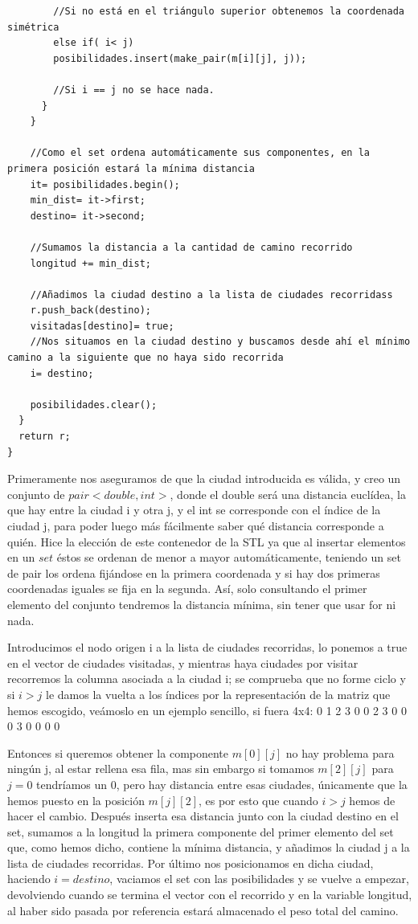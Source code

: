 \documentclass[12pt]{article}
\begin{document}
\begin{itemize}
\begin{lstlisting}
        //Si no está en el triángulo superior obtenemos la coordenada simétrica
        else if( i< j)
        posibilidades.insert(make_pair(m[i][j], j));

        //Si i == j no se hace nada.
      }
    }

    //Como el set ordena automáticamente sus componentes, en la primera posición estará la mínima distancia
    it= posibilidades.begin();
    min_dist= it->first;
    destino= it->second;

    //Sumamos la distancia a la cantidad de camino recorrido
    longitud += min_dist;

    //Añadimos la ciudad destino a la lista de ciudades recorridass
    r.push_back(destino);
    visitadas[destino]= true;
    //Nos situamos en la ciudad destino y buscamos desde ahí el mínimo camino a la siguiente que no haya sido recorrida
    i= destino;

    posibilidades.clear();
  }
  return r;
}
\end{lstlisting}
Primeramente nos aseguramos de que la ciudad introducida es válida, y creo un conjunto de $pair<double, int>$, donde el double será una distancia euclídea, la que hay entre la ciudad i y otra j, y el int se corresponde con el índice de la ciudad j, para poder luego más fácilmente saber qué distancia corresponde a quién. Hice la elección de este contenedor de la STL ya que al insertar elementos en un $set$ éstos se ordenan de menor a mayor automáticamente, teniendo un set de pair los ordena fijándose en la primera coordenada y si hay dos primeras coordenadas iguales se fija en la segunda. Así, solo consultando el primer elemento del conjunto tendremos la distancia mínima, sin tener que usar for ni nada.

Introducimos el nodo origen i a la lista de ciudades recorridas, lo ponemos a true en el vector de ciudades visitadas, y mientras haya ciudades por visitar recorremos la columna asociada a la ciudad i; se comprueba que no forme ciclo y si $i>j$ le damos la vuelta a los índices por la representación de la matriz que hemos escogido, veámoslo en un ejemplo sencillo, si fuera 4x4: 
0 1 2 3
0 0 2 3
0 0 0 3
0 0 0 0

Entonces si queremos obtener la componente $m[0][j]$ no hay problema para ningún j, al estar rellena esa fila, mas sin embargo si tomamos $m[2][j]$ para $j= 0$ tendríamos un 0, pero hay distancia entre esas ciudades, únicamente que la hemos puesto en la posición $m[j][2]$, es por esto que cuando $i>j$ hemos de hacer el cambio. Después inserta esa distancia junto con la ciudad destino en el set, sumamos a la longitud la primera componente del primer elemento del set que, como hemos dicho, contiene la mínima distancia, y añadimos la ciudad j a la lista de ciudades recorridas. Por último nos posicionamos en dicha ciudad, haciendo $i= destino$, vaciamos el set con las posibilidades y se vuelve a empezar, devolviendo cuando se termina el vector con el recorrido y en la variable longitud, al haber sido pasada por referencia estará almacenado el peso total del camino.  
\end{itemize}
\end{document}
